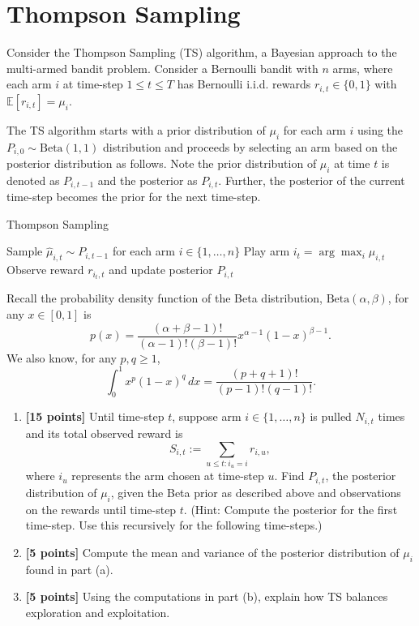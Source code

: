 \documentclass[a3paper,12pt]{extarticle} %
\begin{document}
\section{Thompson Sampling}
Consider the Thompson Sampling (TS) algorithm, a Bayesian approach to the multi-armed bandit problem. Consider a Bernoulli bandit with $n$ arms, where each arm $i$ at time-step $1 \leq t \leq T$ has Bernoulli i.i.d. rewards $r_{i,t} \in \{0, 1\}$ with $\mathbb{E}[r_{i,t}] = \mu_i$. 

The TS algorithm starts with a prior distribution of $\mu_i$ for each arm $i$ using the $P_{i,0} \sim \text{Beta}(1, 1)$ distribution and proceeds by selecting an arm based on the posterior distribution as follows. Note the prior distribution of $\mu_i$ at time $t$ is denoted as $P_{i,t-1}$ and the posterior as $P_{i,t}$. Further, the posterior of the current time-step becomes the prior for the next time-step.

\begin{algorithm}
\caption{Thompson Sampling}
\begin{algorithmic}[1]
    \State Sample $\hat{\mu}_{i,t} \sim P_{i,t-1}$ for each arm $i \in \{1, \ldots, n\}$
    \State Play arm $i_t = \arg \max_i \hat{\mu}_{i,t}$
    \State Observe reward $r_{i_t,t}$ and update posterior $P_{i,t}$
\EndFor
\end{algorithmic}
\end{algorithm}
Recall the probability density function of the Beta distribution, $\text{Beta}(\alpha, \beta)$, for any $x \in [0, 1]$ is
\[
p(x) = \frac{(\alpha + \beta - 1)!}{(\alpha - 1)!(\beta - 1)!} x^{\alpha - 1} (1 - x)^{\beta - 1}.
\]
We also know, for any $p, q \geq 1$,
\[
\int_0^1 x^p (1 - x)^q \, dx = \frac{(p + q + 1)!}{(p - 1)!(q - 1)!}.
\]
\begin{enumerate}
    \item \textbf{[15 points]} Until time-step $t$, suppose arm $i \in \{1, \ldots, n\}$ is pulled $N_{i,t}$ times and its total observed reward is 
    \[
    S_{i,t} := \sum_{u \leq t : i_u = i} r_{i,u},
    \]
    where $i_u$ represents the arm chosen at time-step $u$. Find $P_{i,t}$, the posterior distribution of $\mu_i$, given the Beta prior as described above and observations on the rewards until time-step $t$. 
    (Hint: Compute the posterior for the first time-step. Use this recursively for the following time-steps.)

    \item \textbf{[5 points]} Compute the mean and variance of the posterior distribution of $\mu_i$ found in part (a).

    \item \textbf{[5 points]} Using the computations in part (b), explain how TS balances exploration and exploitation.
\end{enumerate}
\end{document}
